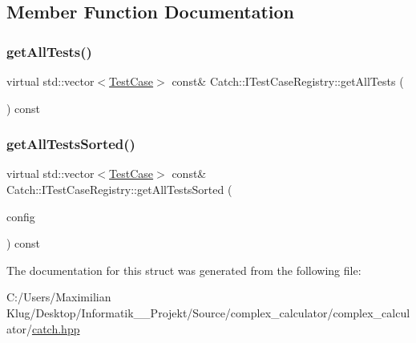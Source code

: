 \subsection{Member Function Documentation}
\mbox{\label{struct_catch_1_1_i_test_case_registry_ad6e4d4a621655123f73ae98cfeda063d}} 
\subsubsection{\texorpdfstring{get\+All\+Tests()}{getAllTests()}}
{\footnotesize\ttfamily virtual std\+::vector$<$\mbox{\hyperlink{class_catch_1_1_test_case}{Test\+Case}}$>$ const\& Catch\+::\+I\+Test\+Case\+Registry\+::get\+All\+Tests (\begin{DoxyParamCaption}{ }\end{DoxyParamCaption}) const\hspace{0.3cm}{\ttfamily [pure virtual]}}

\mbox{\label{struct_catch_1_1_i_test_case_registry_a33e46639d0319d35497c05bb5d02be5a}} 
\subsubsection{\texorpdfstring{get\+All\+Tests\+Sorted()}{getAllTestsSorted()}}
{\footnotesize\ttfamily virtual std\+::vector$<$\mbox{\hyperlink{class_catch_1_1_test_case}{Test\+Case}}$>$ const\& Catch\+::\+I\+Test\+Case\+Registry\+::get\+All\+Tests\+Sorted (\begin{DoxyParamCaption}\item[{\mbox{\hyperlink{struct_catch_1_1_i_config}{I\+Config}} const \&}]{config }\end{DoxyParamCaption}) const\hspace{0.3cm}{\ttfamily [pure virtual]}}



The documentation for this struct was generated from the following file\+:\begin{DoxyCompactItemize}
\item 
C\+:/\+Users/\+Maximilian Klug/\+Desktop/\+Informatik\+\_\+\_\+\+Projekt/\+Source/complex\+\_\+calculator/complex\+\_\+calculator/\mbox{\hyperlink{catch_8hpp}{catch.\+hpp}}\end{DoxyCompactItemize}

